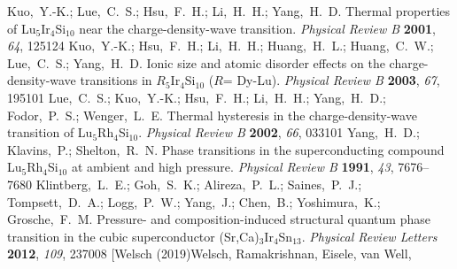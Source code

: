 \documentclass[journal=cmatex,manuscript=article]{achemso}
\begin{document}
\begin{mcitethebibliography}{73}
	Kuo,~Y.-K.; Lue,~C.~S.; Hsu,~F.~H.; Li,~H.~H.; Yang,~H.~D. Thermal properties
	of {Lu}$_{5}${Ir}$_{4}${Si}$_{10}$ near the charge-density-wave transition.
	\emph{Physical Review B} \textbf{2001}, \emph{64}, 125124\relax
	\mciteBstWouldAddEndPuncttrue
	\mciteSetBstMidEndSepPunct{\mcitedefaultmidpunct}
	{\mcitedefaultendpunct}{\mcitedefaultseppunct}\relax
	\EndOfBibitem
	Kuo,~Y.-K.; Hsu,~F.~H.; Li,~H.~H.; Huang,~H.~L.; Huang,~C.~W.; Lue,~C.~S.;
	Yang,~H.~D. Ionic size and atomic disorder effects on the charge-density-wave
	transitions in ${R}$$_{5}${Ir}$_{4}${Si}$_{10}$ (${R}$= {Dy}-{Lu}).
	\emph{Physical Review B} \textbf{2003}, \emph{67}, 195101\relax
	\mciteBstWouldAddEndPuncttrue
	\mciteSetBstMidEndSepPunct{\mcitedefaultmidpunct}
	{\mcitedefaultendpunct}{\mcitedefaultseppunct}\relax
	\EndOfBibitem
	Lue,~C.~S.; Kuo,~Y.-K.; Hsu,~F.~H.; Li,~H.~H.; Yang,~H.~D.; Fodor,~P.~S.;
	Wenger,~L.~E. Thermal hysteresis in the charge-density-wave transition of
	{Lu}$_{5}${Rh}$_{4}${Si}$_{10}$. \emph{Physical Review B} \textbf{2002},
	\emph{66}, 033101\relax
	\mciteBstWouldAddEndPuncttrue
	\mciteSetBstMidEndSepPunct{\mcitedefaultmidpunct}
	{\mcitedefaultendpunct}{\mcitedefaultseppunct}\relax
	\EndOfBibitem
	Yang,~H.~D.; Klavins,~P.; Shelton,~R.~N. Phase transitions in the
	superconducting compound {Lu}$_5${Rh}$_4${Si}$_{10}$ at ambient and high
	pressure. \emph{Physical Review B} \textbf{1991}, \emph{43}, 7676--7680\relax
	\mciteBstWouldAddEndPuncttrue
	\mciteSetBstMidEndSepPunct{\mcitedefaultmidpunct}
	{\mcitedefaultendpunct}{\mcitedefaultseppunct}\relax
	\EndOfBibitem
	Klintberg,~L.~E.; Goh,~S.~K.; Alireza,~P.~L.; Saines,~P.~J.; Tompsett,~D.~A.;
	Logg,~P.~W.; Yang,~J.; Chen,~B.; Yoshimura,~K.; Grosche,~F.~M. Pressure- and
	composition-induced structural quantum phase transition in the cubic
	superconductor ({Sr,Ca})$_{3}${Ir}$_{4}${Sn}$_{13}$. \emph{Physical Review
		Letters} \textbf{2012}, \emph{109}, 237008\relax
	\mciteBstWouldAddEndPuncttrue
	\mciteSetBstMidEndSepPunct{\mcitedefaultmidpunct}
	{\mcitedefaultendpunct}{\mcitedefaultseppunct}\relax
	\EndOfBibitem
	\bibitem[Welsch (2019)Welsch, Ramakrishnan, Eisele, van Well,
$$
\end{mcitethebibliography}
\end{document}
